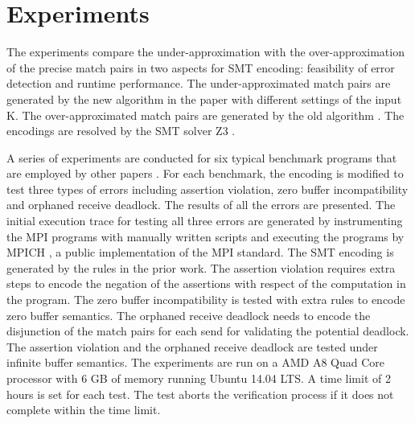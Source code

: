 \section{Experiments}
The experiments compare the under-approximation with the over-approximation of the precise match pairs in two aspects for SMT encoding: feasibility of error detection and runtime performance. The under-approximated match pairs are generated by the new algorithm in the paper with different settings of the input K. The over-approximated match pairs are generated by the old algorithm \cite{}. The encodings are resolved by the SMT solver Z3 \cite{}. 

A series of experiments are conducted for six typical benchmark programs that are employed by other papers \cite{}. For each benchmark, the encoding is modified to test three types of errors including assertion violation, zero buffer incompatibility and orphaned receive deadlock. The results of all the errors are presented. The initial execution trace for testing all three errors are generated by instrumenting the MPI programs with manually written scripts and executing the programs by MPICH \cite{}, a public implementation of the MPI standard. The SMT encoding is generated by the rules in the prior work.
The assertion violation requires extra steps to encode the negation of the assertions with respect of the computation in the program. The zero buffer incompatibility is tested with extra rules to encode zero buffer semantics. The orphaned receive deadlock needs to encode the disjunction of the match pairs for each send for validating the potential deadlock. The assertion violation and the orphaned receive deadlock are tested under infinite buffer semantics. 
The experiments are run on a AMD A8 Quad Core processor with 6 GB of memory running Ubuntu 14.04 LTS. A time limit of 2 hours is set for each test. The test aborts the verification process if it does not complete within the time limit.

